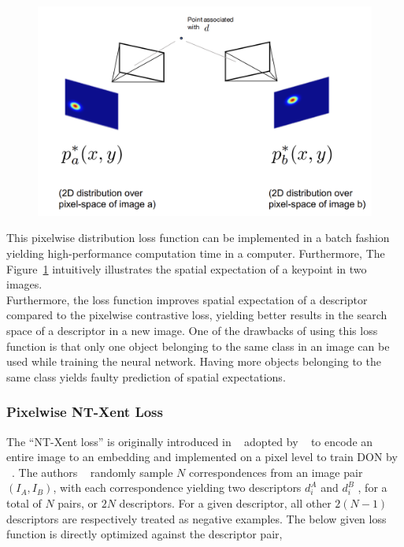 \begin{figure}[htb]
    \centering
    \label{fig:spat_exp}
    \includegraphics[scale=0.17]{images/spatial_expectation.png}
\end{figure}

This pixelwise distribution loss function can be implemented in a batch fashion yielding high-performance computation time in a computer.
Furthermore, The Figure~\ref{fig:spat_exp} intuitively illustrates the spatial expectation of a keypoint in two images.\\

Furthermore, the loss function improves spatial expectation of a descriptor compared to the pixelwise contrastive loss,
yielding better results in the search space of a descriptor in a new image.
One of the drawbacks of using this loss function is that only one object belonging to the same class in an image can
be used while training the neural network. Having more objects belonging to the same class yields faulty prediction of spatial expectations.

\subsubsection{Pixelwise NT-Xent Loss}

The ``NT-Xent loss'' is originally introduced in \citeauthor{simclr}~\cite{simclr} adopted by \citeauthor{infonce}~\cite{infonce} to encode an entire image to an embedding and implemented on a pixel level
to train \ac{DON} by \citeauthor{adrian2022efficient}~\cite{adrian2022efficient}. The authors \citeauthor{adrian2022efficient}~\cite{adrian2022efficient} randomly sample $N$ correspondences from an
image pair $(I_A, I_B)$, with each correspondence yielding two descriptors $d^A_i$ and $d^B_i$ , for a total of $N$ pairs, or
$2N$ descriptors. For a given descriptor, all other $2(N - 1)$ descriptors are respectively treated as negative examples.
The below given loss function is directly optimized against the descriptor pair,

